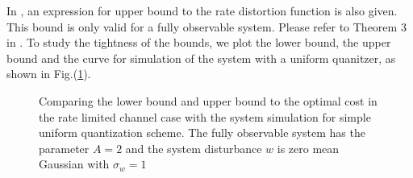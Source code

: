 \documentclass[12pt]{caltech_thesis_progress2}
\begin{document}
In \cite{victoria}, an expression for upper bound to the rate distortion function is also given. This bound is only valid for a fully observable system. Please refer to Theorem 3 in \cite{victoria}.	
%
		To study the tightness of the bounds, we plot the lower bound, the upper bound and the curve for simulation of the system with a uniform quanitzer, as shown in Fig.(\ref{lower_upper_sim}).
		\begin{figure}[H]
			  \centering
%			  
			  \tiny{
			}
			  \caption{Comparing the lower bound and upper bound to the optimal cost in the rate limited channel case with the system simulation for simple uniform quantization scheme. The fully observable system has the parameter $A = 2$ and the system disturbance $w$ is zero mean Gaussian with $\sigma_{w} = 1$}
			 \label{lower_upper_sim}
		\end{figure}	
		
\end{document}
